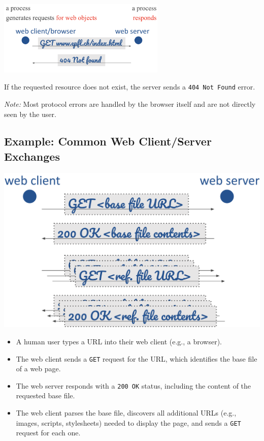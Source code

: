 \documentclass[../../compsys.tex]{subfiles}
\begin{document}
\begin{center}
    \includegraphics[width=0.6\textwidth]{images/404.png}
\end{center}
If the requested resource does not exist, the server sends a \texttt{404 Not Found} error.

\vspace{1em}

\noindent
\textit{Note:} Most protocol errors are handled by the browser itself and are not directly seen by the user.
\subsection{Example: Common Web Client/Server Exchanges}
\begin{minipage}[htp]{0.45\textwidth}
\begin{center}
    \includegraphics[width=\textwidth]{images/common.png}
\end{center}
\end{minipage}
\hfill
\begin{minipage}[htp]{0.45\textwidth}
\small
\begin{itemize}
    \item A human user types a URL into their web client (e.g., a browser).
    \item The web client sends a \texttt{GET} request for the URL, which identifies the base file of a web page.
    \item The web server responds with a \texttt{200 OK} status, including the content of the requested base file.
    \item The web client parses the base file, discovers all additional URLs (e.g., images, scripts, stylesheets) needed to display the page, and sends a \texttt{GET} request for each one.
\end{itemize}
\end{minipage}
\end{document}
